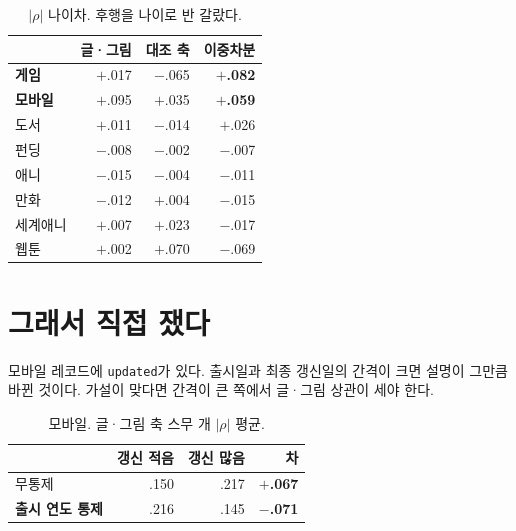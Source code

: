 \documentclass[10pt]{article}
\begin{document}
\begin{table}[t]
\centering\tsize
\caption{$|\rho|$ 나이차. 후행을 나이로 반 갈랐다.}
\begin{tabular}{lrrr}
\toprule
& 글·그림 & 대조 축 & 이중차분 \\
\midrule
\textbf{게임} & $+$.017 & $-$.065 & \textbf{$+$.082} \\
\textbf{모바일} & $+$.095 & $+$.035 & \textbf{$+$.059} \\
도서 & $+$.011 & $-$.014 & $+$.026 \\
펀딩 & $-$.008 & $-$.002 & $-$.007 \\
애니 & $-$.015 & $-$.004 & $-$.011 \\
만화 & $-$.012 & $+$.004 & $-$.015 \\
세계애니 & $+$.007 & $+$.023 & $-$.017 \\
웹툰 & $+$.002 & $+$.070 & $-$.069 \\
\bottomrule
\end{tabular}
\end{table}


\section{그래서 직접 쟀다}

모바일 레코드에 \texttt{updated}가 있다. 출시일과 최종 갱신일의 간격이
크면 설명이 그만큼 바뀐 것이다. 가설이 맞다면 간격이 큰 쪽에서 글·그림
상관이 세야 한다.

\begin{table}[t]
\centering\tsize
\caption{모바일. 글·그림 축 스무 개 $|\rho|$ 평균.}
\begin{tabular}{lrrr}
\toprule
& 갱신 적음 & 갱신 많음 & 차 \\
\midrule
무통제 & .150 & .217 & \textbf{$+$.067} \\
\textbf{출시 연도 통제} & .216 & .145 & \textbf{$-$.071} \\
\bottomrule
\end{tabular}
\end{table}

\end{document}
